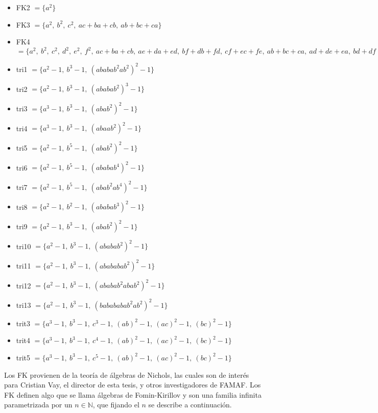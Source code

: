 \documentclass[12pt]{report}
\theoremstyle{customstyle}
\theoremstyle{factstyle}
\begin{document}
\begin{itemize}
  \item FK2 $ = \{a^2\}$
  \item FK3 $ = \{a^2,\ b^2,\ c^2,\ ac + ba + cb,\ ab + bc + ca\}$
  \item FK4 $ = \{a^2,\ b^2,\ c^2,\ d^2,\ e^2,\ f^2,\ ac + ba + cb,\ ae + da + ed,\ bf + db + fd,\ cf + ec + fe,\ ab + bc + ca,\ ad + de + ea,\ bd + df + fb,\ ce + ef + fc,\ cd + dc,\ be + eb,\ af + fa\}$
  \item tri1 $ = \{a^2 - 1,\ b^3 - 1,\ {(ababab^2ab^2)}^2 - 1\}$
  \item tri2 $ = \{a^2 - 1,\ b^3 - 1,\ {(ababab^2)}^3 - 1\}$
  \item tri3 $ = \{a^3 - 1,\ b^3 - 1,\ {(abab^2)}^2 - 1\}$
  \item tri4 $ = \{a^3 - 1,\ b^3 - 1,\ {(abaab^2)}^2 - 1\}$
  \item tri5 $ = \{a^2 - 1,\ b^5 - 1,\ {(abab^2)}^2 - 1\}$
  \item tri6 $ = \{a^2 - 1,\ b^5 - 1,\ {(ababab^4)}^2 - 1\}$
  \item tri7 $ = \{a^2 - 1,\ b^5 - 1,\ {(abab^2ab^4)}^2 - 1\}$
  \item tri8 $ = \{a^2 - 1,\ b^2 - 1,\ {(ababab^3)}^2 - 1\}$
  \item tri9 $ = \{a^2 - 1,\ b^3 - 1,\ {(abab^2)}^2 - 1\}$
  \item tri10 $ = \{a^2 - 1,\ b^3 - 1,\ {(ababab^2)}^2 - 1\}$
  \item tri11 $ = \{a^2 - 1,\ b^3 - 1,\ {(abababab^2)}^2 - 1\}$
  \item tri12 $ = \{a^2 - 1,\ b^3 - 1,\ {(ababab^2abab^2)}^2 - 1\}$
  \item tri13 $ = \{a^2 - 1,\ b^3 - 1,\ {(babababab^2ab^2)}^2 - 1\}$
  \item trit3 $ = \{a^3 - 1,\ b^3 - 1,\ c^3 - 1,\ {(ab)}^2 - 1,\ {(ac)}^2 - 1,\ {(bc)}^2 - 1\}$
  \item trit4 $ = \{a^3 - 1,\ b^3 - 1,\ c^4 - 1,\ {(ab)}^2 - 1,\ {(ac)}^2 - 1,\ {(bc)}^2 - 1\}$
  \item trit5 $ = \{a^3 - 1,\ b^3 - 1,\ c^5 - 1,\ {(ab)}^2 - 1,\ {(ac)}^2 - 1,\ {(bc)}^2 - 1\}$
\end{itemize}

Los FK provienen de la teoría de álgebras de Nichols, las cuales son de interés para Cristian Vay, el director de esta tesis, y otros investigadores de FAMAF. Los FK definen algo que se llama álgebras de Fomin-Kirillov y son una familia infinita parametrizada por un $n ∈ ℕ$, que fijando el $n$ se describe a continuación.
\end{document}
